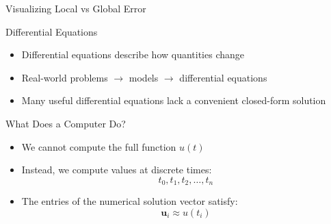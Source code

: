 \documentclass[10pt]{beamer}
\begin{document}
\begin{frame}{Visualizing Local vs Global Error}
\begin{center}
\end{center}


\end{frame}


\begin{frame}{Differential Equations}
    \begin{itemize}
\item Differential equations describe how quantities change
\item Real-world problems $\rightarrow$ models $\rightarrow$ differential equations
\item Many useful differential equations lack a convenient closed-form solution
\end{itemize}

\vspace{3mm}

\end{frame}

\begin{frame}{What Does a Computer Do?}

\begin{itemize}
\item We cannot compute the full function $u(t)$
\item Instead, we compute values at discrete times:
\[
t_0, t_1, t_2, \dots, t_n
\]
\item The entries of the numerical solution vector satisfy:
\[
\textbf{u}_i \approx u(t_i)
\]
\end{itemize}


\end{frame}
\end{document}
